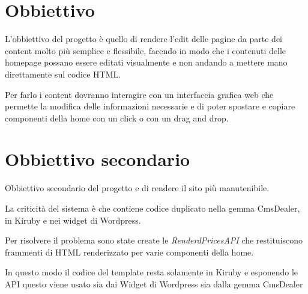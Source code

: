 
\newpage
\section{Obbiettivo}
L'obbiettivo del progetto è quello di rendere l'edit delle pagine
da parte dei content molto più semplice e flessibile,
facendo in modo che i contenuti delle homepage possano essere editati visualmente e non
andando a mettere mano direttamente sul codice HTML.

Per farlo i content dovranno interagire con un interfaccia grafica web che permette
la modifica delle informazioni necessarie e di poter spostare e copiare
componenti della home con un click o con un drag and drop.

\section{Obbiettivo secondario}
Obbiettivo secondario del progetto e di rendere il sito più manutenibile.

La criticità del sistema è che contiene codice duplicato nella gemma CmsDealer, in Kiruby
e nei widget di Wordpress. 

Per risolvere il problema sono state create le  \emph{RenderdPricesAPI} 
che restituiscono frammenti di HTML renderizzato per varie componenti della home.

In questo modo il codice del template resta solamente in Kiruby e esponendo le 
API questo viene usato sia dai Widget di Wordpress sia dalla gemma CmsDealer
